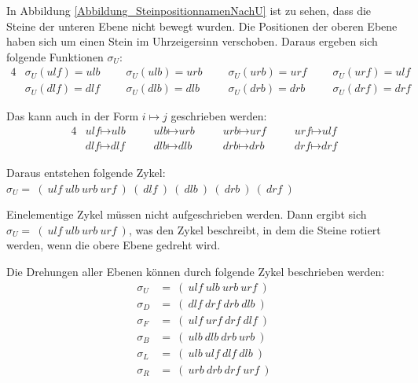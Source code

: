 \documentclass[12pt,a4paper, usenames, dvipsnames]{article}
\theoremstyle{mystyle}
\theoremstyle{definition}
\begin{document}
In Abbildung \ref{Abbildung_SteinpositionnamenNachU} ist zu sehen, dass die Steine der unteren Ebene nicht bewegt wurden. Die Positionen der oberen Ebene haben sich um einen Stein im Uhrzeigersinn verschoben. Daraus ergeben sich folgende Funktionen $\sigma_U$:
\begin{alignat*}{4}
& \sigma_U(\textit{ulf})=\textit{ulb} \ \ \ \ \ \ \ & \sigma_U(\textit{ulb})=\textit{urb} \ \ \ \ \ \ \ & \sigma_U(\textit{urb})=\textit{urf} \ \ \ \ \ \ \ & \sigma_U(\textit{urf})=\textit{ulf} \\
& \sigma_U(\textit{dlf})=\textit{dlf} \ \ \ \ \ \ \ & \sigma_U(\textit{dlb})=\textit{dlb} \ \ \ \ \ \ \ & \sigma_U(\textit{drb})=\textit{drb} \ \ \ \ \ \ \ & \sigma_U(\textit{drf})=\textit{drf} 
\end{alignat*}

Das kann auch in der Form $i \mapsto j$ geschrieben werden: 
\begin{alignat*}{4}
& \textit{ulf} \mapsto \textit{ulb} \ \ \ \ \ \ \ \ & \textit{ulb} \mapsto \textit{urb} \ \ \ \ \ \ \ \ & \textit{urb} \mapsto \textit{urf} \ \ \ \ \ \ \ \ & \textit{urf} \mapsto \textit{ulf} \\
& \textit{dlf} \mapsto \textit{dlf} \ \ \ \ \ \ \ \ & \textit{dlb} \mapsto \textit{dlb} \ \ \ \ \ \ \ \ \ & \textit{drb} \mapsto \textit{drb} \ \ \ \ \ \ \ \ & \textit{drf} \mapsto \textit{drf} 
\end{alignat*}

Daraus entstehen folgende Zykel: $\sigma_U = \ ( \ \textit{ulf} \ \textit{ulb} \ \textit{urb} \ \textit{urf} \ )\ ( \ \textit{dlf} \ )\ ( \ \textit{dlb} \ )\ ( \ \textit{drb} \ )\ ( \ \textit{drf} \ )$

Einelementige Zykel müssen nicht aufgeschrieben werden. Dann ergibt sich $\sigma_U = \ ( \ \textit{ulf} \ \textit{ulb} \ \textit{urb} \ \textit{urf} \ )$, was den Zykel beschreibt, in dem die Steine rotiert werden, wenn die obere Ebene gedreht wird. 


Die Drehungen aller Ebenen können durch folgende Zykel beschrieben werden: 
\begin{align*}
\sigma_U & =\ ( \ \textit{ulf} \ \textit{ulb} \ \textit{urb} \ \textit{urf} \ ) \\
\sigma_D & =\ ( \ \textit{dlf} \ \textit{drf} \ \textit{drb} \ \textit{dlb} \ ) \\
\sigma_F & =\ ( \ \textit{ulf} \ \textit{urf} \ \textit{drf} \ \textit{dlf} \ ) \\
\sigma_B & =\ ( \ \textit{ulb} \ \textit{dlb} \ \textit{drb} \ \textit{urb} \ ) \\
\sigma_L & =\ ( \ \textit{ulb} \ \textit{ulf} \ \textit{dlf} \ \textit{dlb} \ ) \\
\sigma_R & =\ ( \ \textit{urb} \ \textit{drb} \ \textit{drf} \ \textit{urf} \ ) 
\end{align*}
\end{document}
